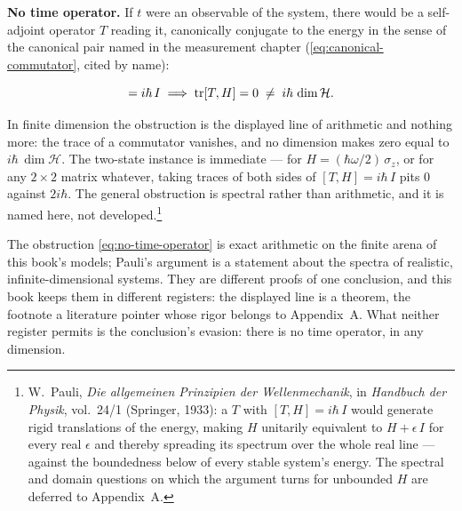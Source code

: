 \textbf{No time operator.} If $t$ were an observable of the system, there would be a self-adjoint operator $T$ reading it, canonically conjugate to the energy in the sense of the canonical pair named in the measurement chapter (\eqref{eq:canonical-commutator}, cited by name):
\begin{linenomath}
    \begin{equation}
        [T,H] = i\hbar\,I \;\Longrightarrow\; \tr[T,H] = 0 \;\neq\; i\hbar\,\dim\mathcal{H} .
        \label{eq:no-time-operator}
    \end{equation}
\end{linenomath}
In finite dimension the obstruction is the displayed line of arithmetic and nothing more: the trace of a commutator vanishes, and no dimension makes zero equal to $i\hbar\,\dim\mathcal{H}$. The two-state instance is immediate --- for $H = (\hbar\omega/2)\,\sigma_z$, or for any $2\times2$ matrix whatever, taking traces of both sides of $[T,H] = i\hbar\,I$ pits $0$ against $2i\hbar$. The general obstruction is spectral rather than arithmetic, and it is named here, not developed.\footnote{W.~Pauli, \emph{Die allgemeinen Prinzipien der Wellenmechanik}, in \emph{Handbuch der Physik}, vol.~24/1 (Springer, 1933): a $T$ with $[T,H] = i\hbar\,I$ would generate rigid translations of the energy, making $H$ unitarily equivalent to $H + \epsilon\,I$ for every real $\epsilon$ and thereby spreading its spectrum over the whole real line --- against the boundedness below of every stable system's energy. The spectral and domain questions on which the argument turns for unbounded $H$ are deferred to Appendix~A.}

\begin{note}
    The obstruction \eqref{eq:no-time-operator} is exact arithmetic on the finite arena of this book's models; Pauli's argument is a statement about the spectra of realistic, infinite-dimensional systems. They are different proofs of one conclusion, and this book keeps them in different registers: the displayed line is a theorem, the footnote a literature pointer whose rigor belongs to Appendix~A. What neither register permits is the conclusion's evasion: there is no time operator, in any dimension.
\end{note}

